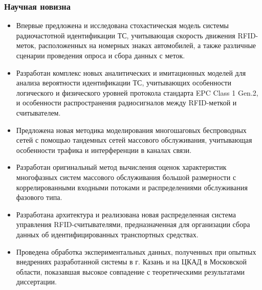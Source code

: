 \begin{frame}
    \frametitle{Научная новизна}
    \footnotesize
    \begin{itemize}
        \item Впервые предложена и исследована стохастическая модель системы радиочастотной идентификации ТС, учитывающая скорость движения RFID-меток, расположенных на номерных знаках автомобилей, а также различные сценарии проведения опроса и сбора данных с меток.
        \item Разработан комплекс новых аналитических и имитационных моделей для анализа вероятности идентификации ТС, учитывающих особенности логического и физического уровней протокола стандарта EPC Class 1 Gen.2, и особенности распространения радиосигналов между RFID-меткой и считывателем.
        \item Предложена новая методика моделирования многошаговых беспроводных сетей с помощью тандемных сетей массового обслуживания, учитывающая особенности трафика и интерференции в каналах связи.
        \item Разработан оригинальный метод вычисления оценок характеристик многофазных систем массового обслуживания большой размерности с коррелированными входными потоками и распределениями обслуживания фазового типа.
        \item Разработана архитектура и реализована новая распределенная система управления RFID-считывателями, предназначенная для организации сбора данных об идентифицированных транспортных средствах.
        \item Проведена обработка экспериментальных данных, полученных при опытных внедрениях разработанной системы в г. Казань и на ЦКАД в Московской области, показавшая высокое совпадение с теоретическими результатами диссертации.
    \end{itemize}
\end{frame}

